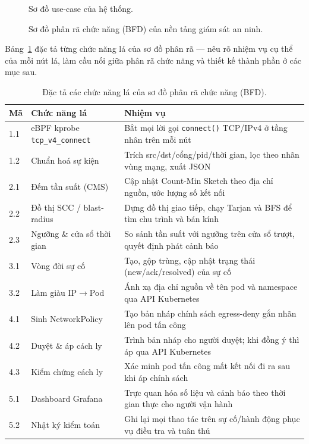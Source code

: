 \begin{figure}[H]
  \centering
  \resizebox{0.9\linewidth}{!}{}
  \caption{Sơ đồ use-case của hệ thống.}
  \label{fig:usecase-soc}
\end{figure}

\begin{figure}[H]
  \centering
  \resizebox{0.92\linewidth}{!}{}
  \caption{Sơ đồ phân rã chức năng (BFD) của nền tảng giám sát an ninh.}
  \label{fig:bfd}
\end{figure}

Bảng~\ref{tab:bfd-leaf} đặc tả từng chức năng lá của sơ đồ phân rã --- nêu rõ nhiệm vụ cụ
thể của mỗi nút lá, làm cầu nối giữa phân rã chức năng và thiết kế thành phần ở các mục sau.

\begin{table}[H]
  \centering
  \caption{Đặc tả các chức năng lá của sơ đồ phân rã chức năng (BFD).}
  \label{tab:bfd-leaf}
  \small
  \begin{tabularx}{\linewidth}{@{}l l X@{}}
    \toprule
    \textbf{Mã} & \textbf{Chức năng lá} & \textbf{Nhiệm vụ} \\
    \midrule
    1.1 & eBPF kprobe \texttt{tcp\_v4\_connect} & Bắt mọi lời gọi \texttt{connect()} TCP/IPv4 ở tầng nhân trên mỗi nút \\
    1.2 & Chuẩn hoá sự kiện           & Trích src/dst/cổng/pid/thời gian, lọc theo nhãn vùng mạng, xuất JSON \\
    2.1 & Đếm tần suất (CMS)          & Cập nhật Count-Min Sketch theo địa chỉ nguồn, ước lượng số kết nối \\
    2.2 & Đồ thị SCC / blast-radius   & Dựng đồ thị giao tiếp, chạy Tarjan và BFS để tìm chu trình và bán kính \\
    2.3 & Ngưỡng \& cửa sổ thời gian  & So sánh tần suất với ngưỡng trên cửa sổ trượt, quyết định phát cảnh báo \\
    3.1 & Vòng đời sự cố              & Tạo, gộp trùng, cập nhật trạng thái (new/ack/resolved) của sự cố \\
    3.2 & Làm giàu IP$\rightarrow$Pod & Ánh xạ địa chỉ nguồn về tên pod và namespace qua API Kubernetes \\
    4.1 & Sinh NetworkPolicy         & Tạo bản nháp chính sách egress-deny gắn nhãn lên pod tấn công \\
    4.2 & Duyệt \& áp cách ly         & Trình bản nháp cho người duyệt; khi đồng ý thì áp qua API Kubernetes \\
    4.3 & Kiểm chứng cách ly         & Xác minh pod tấn công mất kết nối đi ra sau khi áp chính sách \\
    5.1 & Dashboard Grafana          & Trực quan hóa số liệu và cảnh báo theo thời gian thực cho người vận hành \\
    5.2 & Nhật ký kiểm toán          & Ghi lại mọi thao tác trên sự cố/hành động phục vụ điều tra và tuân thủ \\
    \bottomrule
  \end{tabularx}
\end{table}

